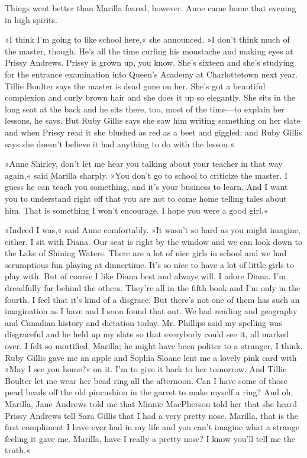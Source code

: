 Things went better than Marilla feared, however. Anne came home that evening in high spirits.

»I think I’m going to like school here,« she announced. »I don’t think much of the master, though. He’s all the time curling his moustache and making eyes at Prissy Andrews. Prissy is grown up, you know. She’s sixteen and she’s studying for the entrance examination into Queen’s Academy at Charlottetown next year. Tillie Boulter says the master is dead gone on her. She’s got a beautiful complexion and curly brown hair and she does it up so elegantly. She sits in the long seat at the back and he sits there, too, most of the time—to explain her lessons, he says. But Ruby Gillis says she saw him writing something on her slate and when Prissy read it she blushed as red as a beet and giggled; and Ruby Gillis says she doesn’t believe it had anything to do with the lesson.«

»Anne Shirley, don’t let me hear you talking about your teacher in that way again,« said Marilla sharply. »You don’t go to school to criticize the master. I guess he can teach you something, and it’s your business to learn. And I want you to understand right off that you are not to come home telling tales about him. That is something I won’t encourage. I hope you were a good girl.«

»Indeed I was,« said Anne comfortably. »It wasn’t so hard as you might imagine, either. I sit with Diana. Our seat is right by the window and we can look down to the Lake of Shining Waters. There are a lot of nice girls in school and we had scrumptious fun playing at dinnertime. It’s so nice to have a lot of little girls to play with. But of course I like Diana best and always will. I adore Diana. I’m dreadfully far behind the others. They’re all in the fifth book and I’m only in the fourth. I feel that it’s kind of a disgrace. But there’s not one of them has such an imagination as I have and I soon found that out. We had reading and geography and Canadian history and dictation today. Mr. Phillips said my spelling was disgraceful and he held up my slate so that everybody could see it, all marked over. I felt so mortified, Marilla; he might have been politer to a stranger, I think. Ruby Gillis gave me an apple and Sophia Sloane lent me a lovely pink card with »May I see you home?« on it. I’m to give it back to her tomorrow. And Tillie Boulter let me wear her bead ring all the afternoon. Can I have some of those pearl beads off the old pincushion in the garret to make myself a ring? And oh, Marilla, Jane Andrews told me that Minnie MacPherson told her that she heard Prissy Andrews tell Sara Gillis that I had a very pretty nose. Marilla, that is the first compliment I have ever had in my life and you can’t imagine what a strange feeling it gave me. Marilla, have I really a pretty nose? I know you’ll tell me the truth.«

